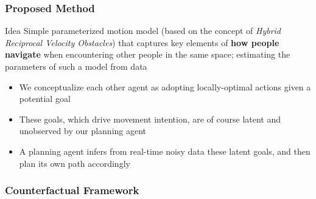 \begin{frame}
	\frametitle{Proposed Method}
	
	\large
	
	\vspace{0.2cm}
	
	\begin{block}{Idea}
		Simple parameterized motion model (based on the concept of \emph{Hybrid Reciprocal
		Velocity Obstacles}) that captures key elements of \textbf{how people navigate}
		when encountering other people in the same space; estimating the parameters of
		such a model from data
	\end{block}
	
	\begin{itemize}
		\item We conceptualize each other agent as adopting locally-optimal actions given
			  a potential goal
		\vspace{0.1cm}
		\item These goals, which drive movement intention, are of course latent and
			  unobserved by our planning agent
		\vspace{0.1cm}
		\item A planning agent infers from real-time noisy data these latent goals, and
			  then plan its own path accordingly
	\end{itemize}
\end{frame}

\begin{frame}
	\frametitle{Counterfactual Framework}
	
	\begin{center}
	\end{center}
\end{frame}
